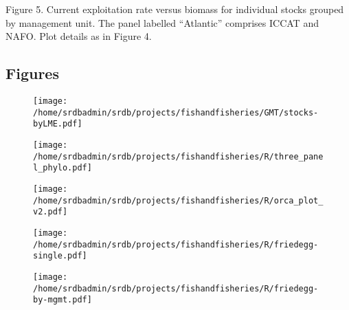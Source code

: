 \noindent Figure 5. Current exploitation rate versus biomass for
individual stocks grouped by management unit. The panel labelled
``Atlantic'' comprises ICCAT and NAFO. Plot details as in
Figure 4.\\


\newpage
\subsection*{Figures}

\begin{figure}
\begin{center}
\texttt{[image: /home/srdbadmin/srdb/projects/fishandfisheries/GMT/stocks-byLME.pdf]}
\end{center}
\caption{ }\label{fig:lmes}
\end{figure}

\begin{figure}
\begin{center}
\texttt{[image: /home/srdbadmin/srdb/projects/fishandfisheries/R/three\_panel\_phylo.pdf]} %
\end{center}
\caption{ }\label{fig:taxo:threepanel}
\end{figure}

\begin{landscape}
\begin{figure}
\begin{center}
\texttt{[image: /home/srdbadmin/srdb/projects/fishandfisheries/R/orca\_plot\_v2.pdf]}
\end{center}
\caption{ }\label{fig:orca}
\end{figure}
\end{landscape}

\begin{figure}
\begin{center}
\texttt{[image: /home/srdbadmin/srdb/projects/fishandfisheries/R/friedegg-single.pdf]}
\end{center}
\caption{ }\label{fig:friedegg}
\end{figure}

\begin{figure}
\begin{center}
\texttt{[image: /home/srdbadmin/srdb/projects/fishandfisheries/R/friedegg-by-mgmt.pdf]}
\end{center}
\caption{ }\label{fig:friedeggmgmt}
\end{figure}

